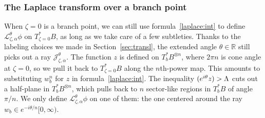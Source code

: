 \documentclass{article}
\let\Re\relax
\DeclareMathOperator{\Re}{Re}
\newcommand{\maps}{\colon}
\newcommand{\R}{\mathbb{R}}
\newcommand{\C}{\mathbb{C}}
\newcommand{\laplace}{\mathcal{L}}
\newcommand{\borel}{\mathcal{B}}
\theoremstyle{definition}
\theoremstyle{plain}
\begin{document}
\subsubsection{The Laplace transform over a branch point}
When $\zeta = 0$ is a branch point, we can still use formula~\eqref{laplace:int} to define $\laplace_{\zeta, \alpha}^\theta \phi$ on $T_{\zeta = 0}^*B$, as long as we take care of a few subtleties. Thanks to the labeling choices we made in Section~\ref{sec:transl}, the extended angle $\theta \in \R$ still picks out a ray $\mathcal{J}_{\zeta, \alpha}^\theta$. The function $z$ is defined on $T_b^*B^{\otimes n}$, where $2\pi n$ is cone angle at $\zeta = 0$, so we pull it back to $T^*_{\zeta = 0} B$ along the $n$th-power map. This amounts to substituting $w_b^n$ for $z$ in formula~\eqref{laplace:int}. The inequality $\Re(e^{i\theta} z) > \Lambda$ cuts out a half-plane in $T_b^*B^{\otimes n}$, which pulls back to $n$ sector-like regions in $T_b^*B$ of angle $\pi/n$. We only define $\laplace_{\zeta, \alpha}^\theta \phi$ on one of them: the one centered around the ray $w_b \in e^{-i\theta/n}[0, \infty)$.
\end{document}
